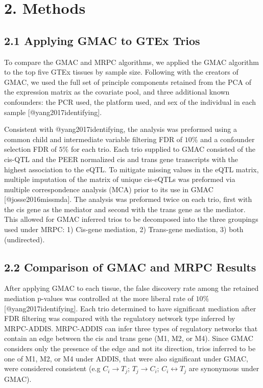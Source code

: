 \documentclass[
]{article}
\begin{document}
\section*{2. Methods}
\subsection*{2.1 Applying GMAC to GTEx Trios}

To compare the GMAC and MRPC algorithms, we applied the GMAC algorithm
to the top five GTEx tissues by sample size. Following with the creators
of GMAC, we used the full set of principle components retained from the
PCA of the expression matrix as the covariate pool, and three additional
known confounders: the PCR used, the platform used, and sex of the
individual in each sample {[}@yang2017identifying{]}.

Consistent with @yang2017identifying, the analysis was preformed using a
common child and intermediate variable filtering FDR of \(10\%\) and a
confounder selection FDR of \(5\%\) for each trio. Each trio supplied to
GMAC consisted of the cis-QTL and the PEER normalized cis and trans gene
transcripts with the highest association to the eQTL. To mitigate
missing values in the eQTL matrix, multiple imputation of the matrix of
unique cis-eQTLs was preformed via multiple correspondence analysis
(MCA) prior to its use in GMAC {[}@josse2016missmda{]}. The analysis was
preformed twice on each trio, first with the cis gene as the mediator
and second with the trans gene as the mediator. This allowed for GMAC
inferred trios to be decomposed into the three groupings used under
MRPC: 1) Cis-gene mediation, 2) Trans-gene mediation, 3) both
(undirected).

\subsection*{2.2 Comparison of GMAC and MRPC Results}

After applying GMAC to each tissue, the false discovery rate among the
retained mediation p-values was controlled at the more liberal rate of
\(10\%\) {[}@yang2017identifying{]}. Each trio determined to have
significant mediation after FDR filtering was compared with the
regulatory network type inferred by MRPC-ADDIS. MRPC-ADDIS can infer
three types of regulatory networks that contain an edge between the cis
and trans gene (M1, M2, or M4). Since GMAC considers only the presence
of the edge and not its direction, trios inferred to be one of M1, M2,
or M4 under ADDIS, that were also significant under GMAC, were
considered consistent (e.g \(C_i \rightarrow T_j\);
\(T_j \rightarrow C_i\); \(C_i \leftrightarrow T_j\) are synonymous
under GMAC).
\end{document}
